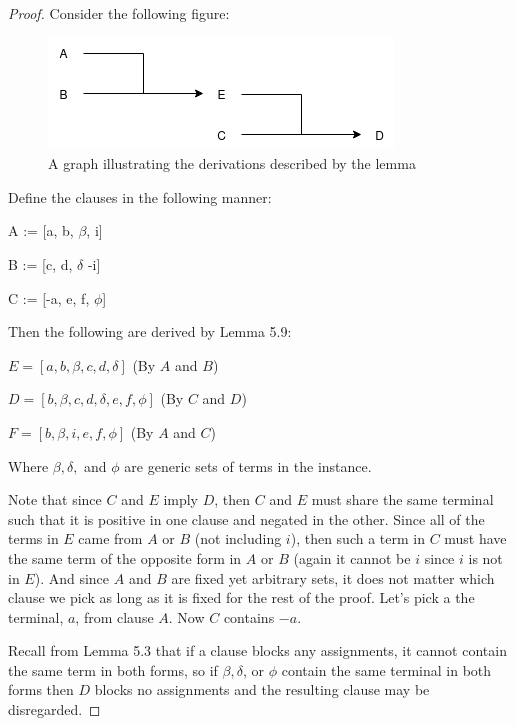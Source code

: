\documentclass[manuscript]{acmart}
\begin{document}
    \begin{proof}
        
        Consider the following figure:
        
        \begin{figure}[h]
            \includegraphics[scale=0.8]{511a}        
            \caption{A graph illustrating the derivations described by the lemma}
            \label{fig:one}
        \end{figure}

        Define the clauses in the following manner:

        A := [a, b, $\beta$, i]

        B := [c, d, $\delta$ -i]

        C := [-a, e, f, $\phi$]

        Then the following are derived by Lemma 5.9:
        
        $E = [a, b, \beta, c, d, \delta]$ (By $A$ and $B$)

        $D = [b, \beta, c, d, \delta, e, f, \phi]$ (By $C$ and $D$)

        $F = [b, \beta, i, e, f, \phi]$ (By $A$ and $C$)

        Where $\beta, \delta, $ and $\phi$ are generic sets of terms in the instance.

        Note that since $C$ and $E$ imply $D$, then $C$ and $E$ must share the
        same terminal such that it is positive in one clause and negated in the other.
        Since all of the terms in $E$ came from $A$ or $B$ (not including $i$),
        then such a term in $C$ must have the same term of the opposite form in
        $A$ or $B$ (again it cannot be $i$ since $i$ is not in $E$). And since
        $A$ and $B$ are fixed yet arbitrary sets, it does not matter which clause
        we pick as long as it is fixed for the rest of the proof. Let's pick a
        the terminal, $a$, from clause $A$. Now $C$ contains $-a$.
 
        Recall from Lemma 5.3 that if a clause blocks any assignments, it cannot
        contain the same term in both forms, so if $\beta, \delta$, or $\phi$ contain
        the same terminal in both forms then $D$ blocks no assignments and the resulting
        clause may be disregarded.


\end{proof}
\end{document}
